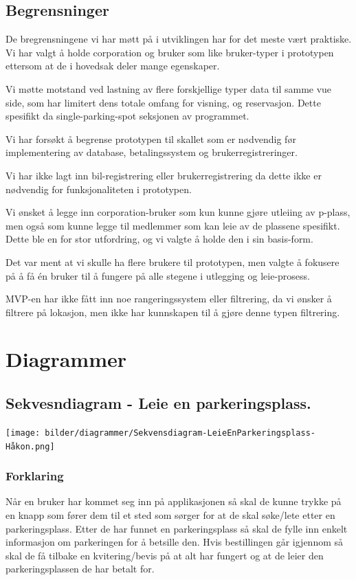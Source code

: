 \documentclass[12pt]{article}
\begin{document}
    \subsection{Begrensninger}
    De bregrensningene vi har møtt på i utviklingen har for det meste vært praktiske. Vi har valgt å holde corporation og bruker som like bruker-typer i prototypen ettersom at de i hovedsak deler mange egenskaper.
    
    Vi møtte motstand ved lastning av flere forskjellige typer data til samme vue side, som har limitert dens totale omfang for visning, og reservasjon. Dette spesifikt da single-parking-spot seksjonen av programmet.
    
    Vi har forsøkt å begrense prototypen til skallet som er nødvendig før implementering av database, betalingssystem og brukerregistreringer.
    
    Vi har ikke lagt inn bil-registrering eller brukerregistrering da dette ikke er nødvendig for funksjonaliteten i prototypen. 
    
    Vi ønsket å legge inn corporation-bruker som kun kunne gjøre utleiing av p-plass, men også som kunne legge til medlemmer som kan leie av de plassene spesifikt. Dette ble en for stor utfordring, og vi valgte å holde den i sin basis-form.
    
    Det var ment at vi skulle ha flere brukere til prototypen, men valgte å fokusere på å få én bruker til å fungere på alle stegene i utlegging og leie-prosess.
    
    MVP-en har ikke fått inn noe rangeringssystem eller filtrering, da vi ønsker å filtrere på lokasjon, men ikke har kunnskapen til å gjøre denne typen filtrering.

\section{Diagrammer}
    \subsection{Sekvesndiagram - Leie en parkeringsplass.}
    \texttt{[image: bilder/diagrammer/Sekvensdiagram-LeieEnParkeringsplass-Håkon.png]}
            \subsubsection{Forklaring}
            Når en bruker har kommet seg inn på applikasjonen så skal de kunne trykke på en knapp som fører dem til et sted som sørger for at de skal søke/lete etter en parkeringsplass. Etter de har funnet en parkeringsplass så skal de fylle inn enkelt informasjon om parkeringen for å betsille den. Hvis bestillingen går igjennom så skal de få tilbake en kvitering/bevis på at alt har fungert og at de leier den parkeringsplassen de har betalt for.
\end{document}
